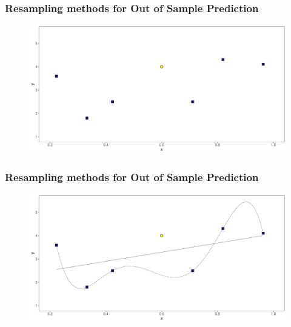 \documentclass[
  shownotes,
  xcolor={svgnames},
  hyperref={colorlinks,citecolor=DarkBlue,linkcolor=andesred,urlcolor=DarkBlue}
  , aspectratio=169]{beamer}
\begin{document}
\begin{frame}
\frametitle{Resampling methods for Out of Sample Prediction}


        \begin{figure}[H] \centering
            \captionsetup{justification=centering}
              \includegraphics[scale=0.4]{figures/fig_all_sample.pdf}
 \end{figure}

\end{frame}



\begin{frame}
\frametitle{Resampling methods for Out of Sample Prediction}


        \begin{figure}[H] \centering
            \captionsetup{justification=centering}
              \includegraphics[scale=0.4]{figures/fig_all_sample_polys.pdf}
 \end{figure}


\end{frame}
\end{document}
